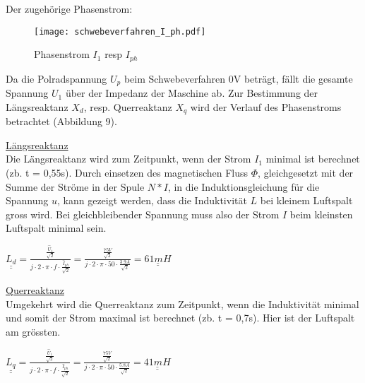 \begin{flushleft}
\newpage

Der zugehörige Phasenstrom:\\
\vspace{0.3cm}
\begin{figure}[H]
    \centering
        \texttt{[image: schwebeverfahren\_I\_ph.pdf]}
    \caption{Phasenstrom $I_1$ resp $I_{ph}$}
    \label{fig:abb1}
\end{figure}


Da die Polradspannung $U_p$ beim Schwebeverfahren 0V beträgt, fällt die gesamte Spannung $U_1$ über der Impedanz der Maschine ab. 
Zur Bestimmung der Längsreaktanz $X_d$, resp. Querreaktanz $X_q$ wird der Verlauf des Phasenstroms betrachtet (Abbildung 9).\\
\vspace{0.4cm}

\underline{Längsreaktanz}\\
\vspace{0.2cm}
Die Längsreaktanz wird zum Zeitpunkt, wenn der Strom $I_1$ minimal ist  berechnet (zb. t = 0,55s). 
Durch einsetzen des magnetischen Fluss $\Phi$, gleichgesetzt mit der Summe der Ströme in der Spule $N*I$, in die Induktionsgleichung für die Spannung $u$, kann gezeigt werden, dass die Induktivität $L$ bei kleinem Luftspalt gross wird. Bei gleichbleibender Spannung muss also der Strom $I$ beim kleinsten Luftspalt minimal sein. 


\begin{center}
\begin{Large}
$ \underline{\underline{L_d}}= \frac{\frac{\hat{U}_1}{\sqrt{2}}}{j \cdot 2 \cdot \pi \cdot f \cdot \frac{\hat{I}_{ph}}{\sqrt{2}} }  = \frac{\frac{75 V}{\sqrt{2}}}{j \cdot 2 \cdot \pi \cdot 50 \cdot \frac{3.9 A}{\sqrt{2}} } = \underline{\underline{61 mH}}$\\
\end{Large}
\end{center}


\newpage




\underline{Querreaktanz}\\
\vspace{0.2cm}
Umgekehrt wird die Querreaktanz zum Zeitpunkt, wenn die Induktivität minimal und somit der Strom maximal ist berechnet (zb. t = 0,7s). Hier ist der Luftspalt am grössten.

\begin{center}
\begin{Large}
$ \underline{\underline{L_q}}= \frac{\frac{\hat{U}_1}{\sqrt{2}}}{j \cdot 2 \cdot \pi \cdot f \cdot \frac{\hat{I}_{ph}}{\sqrt{2}} }  = \frac{\frac{75 V}{\sqrt{2}}}{j \cdot 2 \cdot \pi \cdot 50 \cdot \frac{5.8 A}{\sqrt{2}} } = \underline{\underline{41 mH}}$\\
\end{Large}
\end{center}



\end{flushleft}
